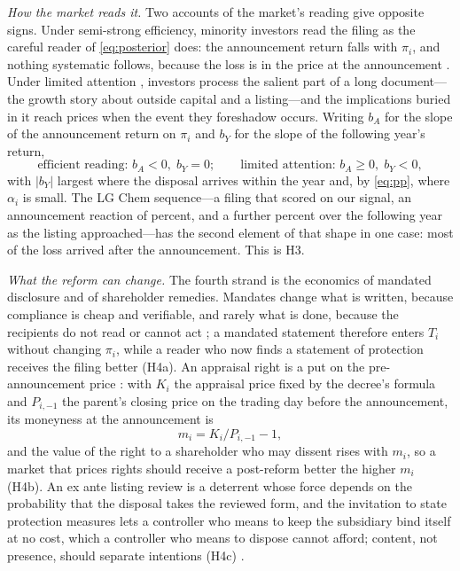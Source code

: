 \emph{How the market reads it.} Two accounts of the market's reading give opposite signs. Under semi-strong efficiency, minority investors read the filing as the careful reader of \eqref{eq:posterior} does: the announcement return falls with $\pi_i$, and nothing systematic follows, because the loss is in the price at the announcement \cite{schipper1986, nanda1991}. Under limited attention \cite{hirshleifer2003, dellavigna2009}, investors process the salient part of a long document---the growth story about outside capital and a listing---and the implications buried in it reach prices when the event they foreshadow occurs. Writing $b_A$ for the slope of the announcement return on $\pi_i$ and $b_Y$ for the slope of the following year's return,
\begin{equation}\label{eq:market}
\text{efficient reading: } b_A < 0,\; b_Y = 0; \qquad \text{limited attention: } b_A \ge 0,\; b_Y < 0,
\end{equation}
with $|b_Y|$ largest where the disposal arrives within the year and, by \eqref{eq:pp}, where $\alpha_i$ is small. The LG Chem sequence---a filing that scored \LGScore{} on our signal, an announcement reaction of \LGAnnCar{} percent, and a further \LGBhar{} percent over the following year as the listing approached---has the second element of that shape in one case: most of the loss arrived after the announcement. This is H3.

\emph{What the reform can change.} The fourth strand is the economics of mandated disclosure and of shareholder remedies. Mandates change what is written, because compliance is cheap and verifiable, and rarely what is done, because the recipients do not read or cannot act \cite{benshahar2014}; a mandated statement therefore enters $T_i$ without changing $\pi_i$, while a reader who now finds a statement of protection receives the filing better (H4a). An appraisal right is a put on the pre-announcement price \cite{jiang2016}: with $K_i$ the appraisal price fixed by the decree's formula and $P_{i,-1}$ the parent's closing price on the trading day before the announcement, its moneyness at the announcement is
\begin{equation}\label{eq:moneyness}
m_i = K_i / P_{i,-1} - 1 ,
\end{equation}
and the value of the right to a shareholder who may dissent rises with $m_i$, so a market that prices rights should receive a post-reform \captive{} better the higher $m_i$ (H4b). An ex ante listing review is a deterrent whose force depends on the probability that the disposal takes the reviewed form, and the invitation to state protection measures lets a controller who means to keep the subsidiary bind itself at no cost, which a controller who means to dispose cannot afford; content, not presence, should separate intentions (H4c) \cite{jensen1976, farrell1996}.

